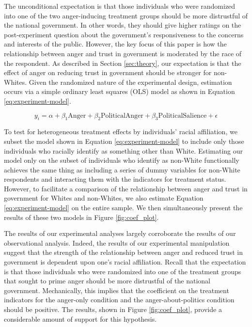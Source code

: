 \documentclass[12pt, letterpaper]{article}
\begin{document}
The unconditional expectation is that those individuals who were randomized into one of the two anger-inducing treatment groups should be more distrustful of the national government. In other words, they should give higher ratings on the post-experiment question about the government's responsiveness to the concerns and interests of the public. However, the key focus of this paper is how the relationship between anger and trust in government is moderated by the race of the respondent. As described in Section \ref{sec:theory}, our expectation is that the effect of anger on reducing trust in government should be stronger for non-Whites. Given the randomized nature of the experimental design, estimation occurs via a simple ordinary least squares (OLS) model as shown in Equation \ref{eq:experiment-model}.

\vspace{-13mm}
\begin{center}
\begin{equation}
y_i = \alpha + \beta_1\textrm{Anger} + \beta_2\textrm{PoliticalAnger} + \beta_3\textrm{PoliticalSalience} + \epsilon
\label{eq:experiment-model}
\end{equation}
\end{center}

To test for heterogeneous treatment effects by individuals' racial affiliation, we subset the model shown in Equation \ref{eq:experiment-model} to include only those individuals who racially identify as something other than White. Estimating our model only on the subset of individuals who identify as non-White functionally achieves the same thing as including a series of dummy variables for non-White respondents and interacting them with the indicators for treatment status. However, to facilitate a comparison of the relationship between anger and trust in government for Whites and non-Whites, we also estimate Equation \ref{eq:experiment-model} on the entire sample. We then simultaneously present the results of these two models in Figure \ref{fig:coef_plot}.

The results of our experimental analyses largely corroborate the results of our observational analysis. Indeed, the results of our experimental manipulation suggest that the strength of the relationship between anger and reduced trust in government is dependent upon one's racial affiliation. Recall that the expectation is that those individuals who were randomized into one of the treatment groups that sought to prime anger should be more distrustful of the national government. Mechanically, this implies that the coefficient on the treatment indicators for the anger-only condition and the anger-about-politics condition should be positive. The results, shown in Figure \ref{fig:coef_plot}, provide a considerable amount of support for this hypothesis.
\end{document}
